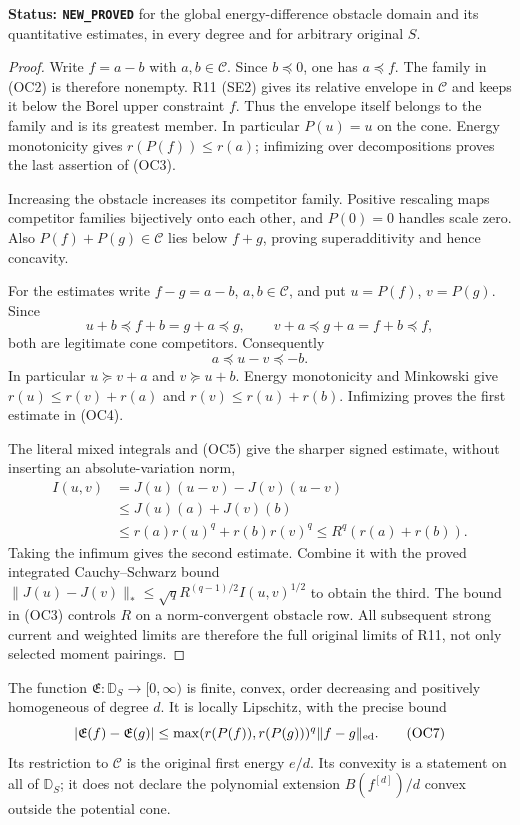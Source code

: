 \noindent\textbf{Status: \texttt{NEW\_PROVED}} for the
global energy-difference obstacle domain and its quantitative
estimates, in every degree and for arbitrary original $S$.

\begin{proof}
Write $f=a-b$ with $a,b\in\mathscr C$.  Since $b\preceq0$,
one has $a\preceq f$.  The family in \textup{(OC2)} is therefore
nonempty.  R11 \textup{(SE2)} gives its relative envelope in
$\mathscr C$ and keeps it below the Borel upper constraint $f$.
Thus the envelope itself belongs to the family and is its
greatest member.  In particular $P(u)=u$ on the cone.
Energy monotonicity gives $r(P(f))\le r(a)$; infimizing over
decompositions proves the last assertion of \textup{(OC3)}.

Increasing the obstacle increases its competitor family.
Positive rescaling maps competitor families bijectively onto
each other, and $P(0)=0$ handles scale zero.  Also
$P(f)+P(g)\in\mathscr C$ lies below $f+g$, proving
superadditivity and hence concavity.

For the estimates write $f-g=a-b$, $a,b\in\mathscr C$, and
put $u=P(f)$, $v=P(g)$.  Since
\[
 u+b\preceq f+b=g+a\preceq g,\qquad
 v+a\preceq g+a=f+b\preceq f,
\]
both are legitimate cone competitors.  Consequently
\[
                        a\preceq u-v\preceq-b.
 \tag{OC5}
\]
In particular $u\succeq v+a$ and $v\succeq u+b$.
Energy monotonicity and Minkowski give
$r(u)\le r(v)+r(a)$ and $r(v)\le r(u)+r(b)$.
Infimizing proves the first estimate in \textup{(OC4)}.

The literal mixed integrals and \textup{(OC5)} give the sharper
signed estimate, without inserting an absolute-variation norm,
\[
 \begin{split}
 I(u,v)&=J(u)(u-v)-J(v)(u-v)\\
       &\le J(u)(a)+J(v)(b)\\
       &\le r(a)r(u)^q+r(b)r(v)^q
        \le R^q(r(a)+r(b)).
 \end{split}
 \tag{OC6}
\]
Taking the infimum gives the second estimate.  Combine it with
the proved integrated Cauchy--Schwarz bound
$\|J(u)-J(v)\|_*\le\sqrt q R^{(q-1)/2}I(u,v)^{1/2}$
to obtain the third.  The bound in \textup{(OC3)} controls
$R$ on a norm-convergent obstacle row.  All subsequent
strong current and weighted limits are therefore the full
original limits of R11, not only selected moment pairings.
\end{proof}

\begin{proposition}
\label{prop:r12-convex-obstacle-energy}
The function $\mathfrak E:\mathbb D_S\to[0,\infty)$ is
finite, convex, order decreasing and positively homogeneous
of degree $d$.  It is locally Lipschitz, with the precise bound
\[
       |\mathfrak E(f)-\mathfrak E(g)|
           \le\max(r(P(f)),r(P(g)))^q\|f-g\|_{\rm ed}.
 \tag{OC7}
\]
Its restriction to $\mathscr C$ is the original first energy
$e/d$.  Its convexity is a statement on all of $\mathbb D_S$;
it does not declare the polynomial extension $B(f^{[d]})/d$
convex outside the potential cone.
\end{proposition}

